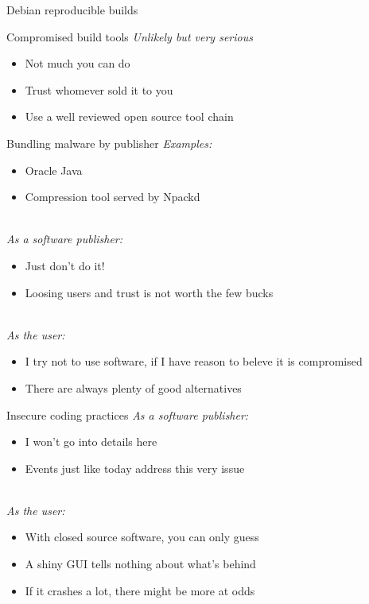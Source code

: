 \documentclass[11pt]{beamer}
\begin{document}
\begin{frame}{Debian reproducible builds}
\end{frame}

\begin{frame}{Compromised build tools}
\emph{Unlikely but very serious}
\\[0.2cm]
\begin{itemize}
\item Not much you can do
\item Trust whomever sold it to you
\item Use a well reviewed open source tool chain
\end{itemize}
\end{frame}

\begin{frame}{Bundling malware by publisher}
\emph{Examples:}
\begin{itemize}
\item Oracle Java
\item Compression tool served by Npackd %
\end{itemize}
\\[0.2cm]
\pause
\emph{As a software publisher:}
\begin{itemize}
\item Just don't do it!
\item Loosing users and trust is not worth the few bucks
\end{itemize}
\\[0.2cm]
\pause
\emph{As the user:}
\begin{itemize}
\item I try not to use software, if I have reason to beleve it is compromised %
\item There are always plenty of good alternatives
\end{itemize}
\end{frame}

\begin{frame}{Insecure coding practices}
\emph{As a software publisher:}
\begin{itemize}
\item I won't go into details here
\item Events just like today address this very issue
\end{itemize}
\\[0.2cm]
\pause
\emph{As the user:}
\begin{itemize}
\item With closed source software, you can only guess
\item A shiny GUI tells nothing about what's behind
\item If it crashes a lot, there might be more at odds
\end{itemize}
\end{frame}
\end{document}
